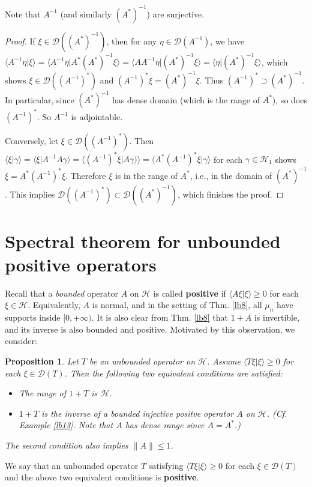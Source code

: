 \documentclass[12pt,a4paper,notitlepage]{article}
\theoremstyle{definition}
\theoremstyle{plain}
\newtheorem{pp}[df]{Proposition}
\newcommand{\mc}{\mathcal}
\newcommand{\Dom}{\scr D}
\newcommand{\bk}[1]{\langle {#1}\rangle}
\newcommand{\scr}{\mathscr}
\numberwithin{equation}{section}
\begin{document}
Note that $A^{-1}$ (and similarly $(A^*)^{-1}$) are surjective.

\begin{proof}
If $\xi\in \Dom((A^*)^{-1})$, then  for any $\eta\in\Dom(A^{-1})$, we have $\bk{A^{-1}\eta|\xi}=\bk{A^{-1}\eta|A^*(A^*)^{-1}\xi}=\bk{AA^{-1}\eta|(A^*)^{-1}\xi}=\bk{\eta|(A^*)^{-1}\xi}$, which shows $\xi\in\Dom((A^{-1})^*)$ and $(A^{-1})^*\xi=(A^*)^{-1}\xi$. Thus $(A^{-1})^*\supset(A^*)^{-1}$. In particular, since $(A^*)^{-1}$ has dense domain (which is the range of $A^*$), so does $(A^{-1})^*$. So $A^{-1}$ is adjointable.

Conversely, let $\xi\in \Dom((A^{-1})^*)$. Then $\bk{\xi|\gamma}=\bk{\xi|A^{-1}A\gamma}=\bk{(A^{-1})^*\xi|A\gamma)}=\bk{A^*(A^{-1})^*\xi|\gamma}$ for each $\gamma\in\mc H_1$ shows  $\xi=A^*(A^{-1})^*\xi$. Therefore $\xi$ is in the range of $A^*$, i.e., in the domain of $(A^*)^{-1}$. This implies $\Dom((A^{-1})^*)\subset\Dom((A^*)^{-1})$, which finishes the proof.
\end{proof}


\section{Spectral theorem for unbounded positive operators}

Recall that a \textit{bounded} operator $A$ on $\mc H$ is called \textbf{positive} if $\bk{A\xi|\xi}\geq 0$ for each $\xi\in\mc H$. Equivalently, $A$ is normal, and in the setting of Thm. \ref{lb8},  all $\mu_n$ have supports inside $[0,+\infty)$. It is also clear from Thm. \ref{lb8} that $1+A$ is invertible, and its inverse is also bounded and positive. Motivated by this observation, we consider:

\begin{pp}\label{lb11}
Let $T$ be an unbounded operator on $\mc H$. Assume $\bk{T\xi|\xi}\geq 0$ for each $\xi\in\Dom(T)$. Then  the following two equivalent conditions are satisfied:
\begin{itemize}
	\item The range of $1+T$ is $\mc H$.
	\item $1+T$ is the inverse of a bounded injective positve operator $A$ on $\mc H$. (Cf. Example \ref{lb13}. Note that $A$ has dense range since $A=A^*$.)
\end{itemize}
The second condition also implies $\lVert A\lVert\leq 1$. 
\end{pp}

We say that an unbounded operator $T$ satisfying $\bk{T\xi|\xi}\geq 0$ for each $\xi\in\Dom(T)$ and the above two equivalent conditions is \textbf{positive}.
\end{document}
